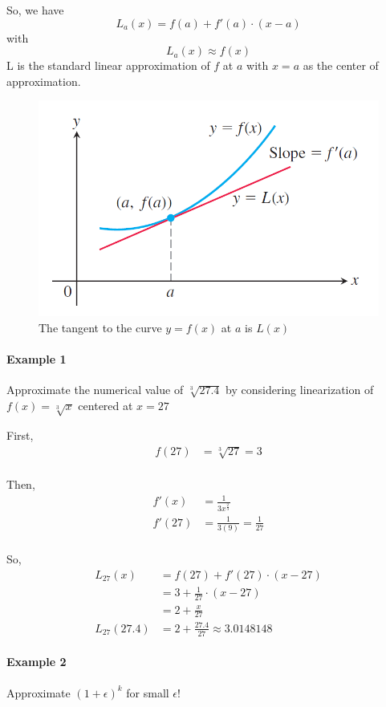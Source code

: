 \documentclass[12pt]{article}
\begin{document}
\noindent
So, we have
\[
    L_a(x) = f(a) + f'(a) \cdot (x - a)
\]
with 
\[
    L_a(x) \approx f(x)
\]
L is the standard linear approximation of $f$ at $a$ with $x = a$ as the center of approximation.

\begin{figure}[h!]
     \centering
     \includegraphics[width=0.5\linewidth]{Images/linearization.png}
     \caption{The tangent to the curve $y = f(x)$ at $a$ is $L(x)$}
\end{figure}
\paragraph{Example 1}
Approximate the numerical value of $\sqrt[3]{27.4}$ by considering linearization of $f(x) = \sqrt[3]{x}$ centered at $x = 27$

First,
\begin{align*} 
     f(27) &= \sqrt[3]{27} = 3 \\
\end{align*}

Then,
\begin{align*} 
    f'(x) &= \frac{1}{3x^{\frac{2}{3}}} \\
    f'(27) &= \frac{1}{3(9)} = \frac{1}{27} \\
\end{align*}

So,
\begin{align*} 
    L_{27}(x) &= f(27) + f'(27) \cdot (x - 27) \\
    &= 3 + \frac{1}{27} \cdot (x - 27) \\
    &= 2 + \frac{x}{27} \\
    L_{27}(27.4) &= 2 + \frac{27.4}{27} \approx 3.0148148
\end{align*}

\paragraph{Example 2} 
Approximate $(1 + \epsilon)^k$ for small $\epsilon$! \\ \\
\end{document}
